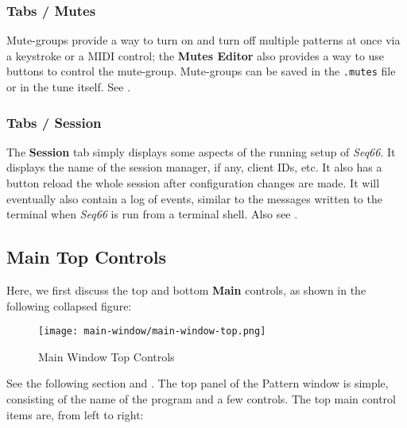 \subsubsection{Tabs / Mutes}
\label{subsubsec:introduction_main_tabs_mutes}

   Mute-groups provide a way to turn on and turn off multiple patterns at once
   via a keystroke or a MIDI control; the \textbf{Mutes Editor} also provides a
   way to use buttons to control the mute-group.
   Mute-groups can be saved in the
   \texttt{.mutes} file or in the tune itself.
   See .

\subsubsection{Tabs / Session}
\label{subsubsec:introduction_main_tabs_session}

   The \textbf{Session} tab simply displays some aspects of the running setup of
   \textsl{Seq66}.  It displays the name of the session manager, if any, client
   IDs, etc.  It also has a button reload the whole session after configuration
   changes are made.  It will eventually also contain a log of events, similar
   to the messages written to the terminal when \textsl{Seq66} is run from a
   terminal shell.
   Also see .

\subsection{Main Top Controls}
\label{subsec:introduction_main_top_controls}

   Here, we first discuss the top and bottom \textbf{Main} controls, as
   shown in the following collapsed figure:

\begin{figure}[H]
   \centering 
   \texttt{[image: main-window/main-window-top.png]}
   \caption{Main Window Top Controls}
   \label{fig:main_window_top_controls}
\end{figure}

   See the following section and
   .
   The top panel of the Pattern window is simple, consisting of the
   name of the program and a few controls.
   The top main control items are, from left to right:


